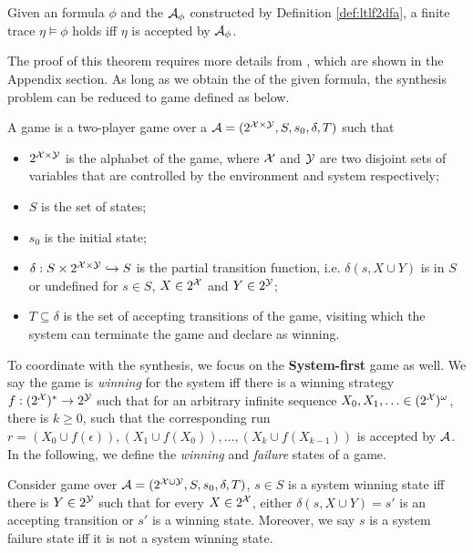 \begin{theorem}\label{thm:ltlf2tdfa}
Given an \ltlf formula $\phi$ and the \tdfa ${\mathcal{A}_{\phi}}$ constructed by Definition \ref{def:ltlf2dfa}, a finite trace $\eta\models\phi$ holds iff $\eta$ is accepted by ${\mathcal{A}_{\phi}}$. 
\end{theorem}
The proof of this theorem requires more details from \cite{LRPZV19}, which are shown in the Appendix section. As long as we obtain the \tdfa of the given \ltlf formula, the synthesis problem can be reduced to \tdfa game defined as below.

\begin{definition}\label{tdfa-game}
	A \tdfa game is a two-player game over a \tdfa $\mathcal{A} = (2^{\mathcal{X} \times \mathcal{Y}}, S, s_0, \delta, T)$ such that 
	\begin{itemize}
		\item $2^{\mathcal{X} \times \mathcal{Y}}$ is the alphabet of the game, where $\mathcal{X}$ and $\mathcal{Y}$ are two disjoint sets of variables that are controlled by the environment and system respectively;
		\item $S$ is the set of states;
		\item $s_0$ is the initial state;
		\item $\delta:S\times 2^{\mathcal{X} \times \mathcal{Y}}\hookrightarrow S$ is the partial transition function, i.e. $\delta (s, X\cup Y)$ is in $S$ or undefined for $s\in S$, $X\in 2^{\mathcal{X}}$ and $Y\in 2^{\mathcal{Y}}$;
    \item $T \subseteq \delta$ is the set of accepting transitions of the game, visiting which the system can terminate the game and declare as winning.
	\end{itemize}
\end{definition}
To coordinate with the \ltlf synthesis, we focus on the \textbf{System-first} \tdfa game as well. We say the game is \emph{winning} for the system iff there is a winning strategy $f: (2^{\mathcal{X}})^*\rightarrow 2^{\mathcal{Y}}$ such that for an arbitrary infinite sequence $X_0,X_1,\ldots\in (2^{\mathcal{X}})^{\omega}$, there is $k\geq 0$, such that the corresponding run $r = (X_0\cup f(\epsilon)), (X_1\cup f(X_0)),\ldots, (X_k\cup f(X_{k-1}))$ is accepted by $\mathcal{A}$.
In the following, we define the \emph{winning} and \emph{failure} states of a \tdfa game.

\begin{definition}\label{def:winning_failure_state}
\label{def:win_st}
Consider \tdfa game over $\mathcal{A} =(2^{\mathcal{X} \cup \mathcal{Y}},S,s_0,\delta,T)$, $s\in S$ is a system winning state iff there is $Y \in 2^{\mathcal{Y}}$ such that for every $X \in 2^{\mathcal{X}}$, either $\delta(s,X\cup Y)=s'$ is an accepting transition or $s'$ is a winning state. Moreover, we say $s$ is a system failure state iff it is not a system winning state.
\end{definition}


